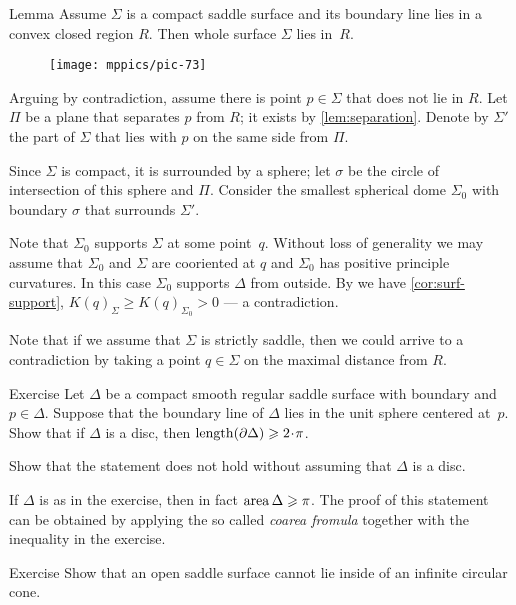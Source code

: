 \begin{thm}{Lemma}\label{lem:convex-saddle}
Assume $\Sigma$ is a compact saddle surface and its boundary line lies in a convex closed region $R$.
Then whole surface $\Sigma$ lies in~$R$.
\end{thm}

\begin{wrapfigure}{O}{50 mm}
\vskip-0mm
\centering
\texttt{[image: mppics/pic-73]}
\vskip0mm
\end{wrapfigure}

Arguing by contradiction,
assume there is point $p\in \Sigma$ that does not lie in $R$.
Let $\Pi$ be a plane that separates $p$ from $R$; it exists by \ref{lem:separation}.
Denote by $\Sigma'$ the part of $\Sigma$ that lies with $p$ on the same side from $\Pi$.

Since $\Sigma$ is compact, it is surrounded by a sphere;
let $\sigma$ be the circle of intersection of this sphere and $\Pi$.
Consider the smallest spherical dome $\Sigma_0$ with boundary $\sigma$ that surrounds $\Sigma'$.

Note that $\Sigma_0$ supports $\Sigma$ at some point~$q$.
Without loss of generality we may assume that $\Sigma_0$ and $\Sigma$ are cooriented at $q$ and $\Sigma_0$ has positive principle curvatures.
In this case $\Sigma_0$ supports $\Delta$ from outside.
By we have \ref{cor:surf-support}, $K(q)_\Sigma\ge K(q)_{\Sigma_0}>0$ --- a contradiction.
\qeds

Note that if we assume that $\Sigma$ is strictly saddle, then we could arrive to a contradiction by taking a point $q\in \Sigma$ on the maximal distance from $R$.

\begin{thm}{Exercise}\label{ex:length-of-bry}
Let $\Delta$ be a compact smooth regular saddle surface with boundary and $p\in \Delta$.
Suppose that the boundary line of $\Delta$ lies in the unit sphere centered at~$p$.
Show that if $\Delta$ is a disc, then $\length (\partial \Delta)\ge 2\cdot\pi$.

Show that the statement does not hold without assuming that $\Delta$ is a disc.
\end{thm}

If $\Delta$ is as in the exercise, then in fact $\mathop{\rm area}\nolimits \Delta\geqslant \pi$.
The proof of this statement can be obtained by applying the so called \emph{coarea fromula} together with the inequality in the exercise. 

\begin{thm}{Exercise}\label{ex:circular-cone-saddle}
Show that an open saddle surface
cannot lie inside of an infinite circular cone. 
\end{thm}

